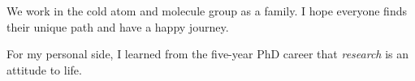 We work in the cold atom and molecule group as a family. I hope everyone finds their unique path and have a happy journey.



For my personal side, I learned from the five-year PhD career that \textit{research} is an attitude to life. 